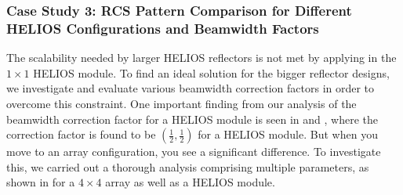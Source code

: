 \subsubsection{Case Study 3: RCS Pattern Comparison for Different HELIOS Configurations and Beamwidth Factors}
The scalability needed by larger HELIOS reflectors is not met by applying  in the $\num{1}\times \num{1}$ HELIOS module. To find an ideal solution for the bigger reflector designs, we investigate and evaluate various beamwidth correction factors in order to overcome this constraint. 
One important finding from our analysis of the beamwidth correction factor for a HELIOS module is seen in  and , where the correction factor is found to be $(\frac{1}{2},\frac{1}{2})$ for a HELIOS module. But when you move to an array configuration, you see a significant difference. To investigate this, we carried out a thorough analysis comprising multiple parameters, as shown in  for a $\num{4}\times \num{4}$ array as well as a HELIOS module.

